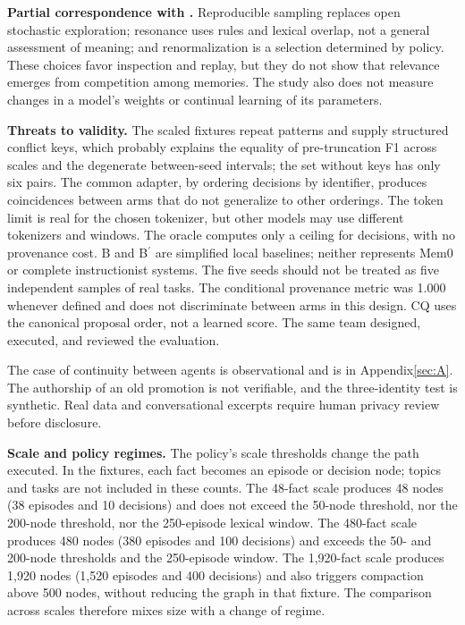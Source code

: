 \documentclass[11pt,a4paper]{article}
\begin{document}
\textbf{Partial correspondence with \cite{ref2}.} Reproducible sampling replaces open stochastic exploration; resonance uses rules and lexical overlap, not a general assessment of meaning; and renormalization is a selection determined by policy. These choices favor inspection and replay, but they do not show that relevance emerges from competition among memories. The study also does not measure changes in a model's weights or continual learning of its parameters.

\textbf{Threats to validity.} The scaled fixtures repeat patterns and supply structured conflict keys, which probably explains the equality of pre-truncation F1 across scales and the degenerate between-seed intervals; the set without keys has only six pairs. The common adapter, by ordering decisions by identifier, produces coincidences between arms that do not generalize to other orderings. The token limit is real for the chosen tokenizer, but other models may use different tokenizers and windows. The oracle computes only a ceiling for decisions, with no provenance cost. B and B\ensuremath{^{\prime}} are simplified local baselines; neither represents Mem0 or complete instructionist systems. The five seeds should not be treated as five independent samples of real tasks. The conditional provenance metric was 1.000 whenever defined and does not discriminate between arms in this design. CQ uses the canonical proposal order, not a learned score. The same team designed, executed, and reviewed the evaluation.

The case of continuity between agents is observational and is in Appendix\nobreakspace{}\ref{sec:A}. The authorship of an old promotion is not verifiable, and the three-identity test is synthetic. Real data and conversational excerpts require human privacy review before disclosure.

\textbf{Scale and policy regimes.} The policy's scale thresholds change the path executed. In the fixtures, each fact becomes an episode or decision node; topics and tasks are not included in these counts. The 48-fact scale produces 48 nodes (38 episodes and 10 decisions) and does not exceed the 50-node threshold, nor the 200-node threshold, nor the 250-episode lexical window. The 480-fact scale produces 480 nodes (380 episodes and 100 decisions) and exceeds the 50- and 200-node thresholds and the 250-episode window. The 1,920-fact scale produces 1,920 nodes (1,520 episodes and 400 decisions) and also triggers compaction above 500 nodes, without reducing the graph in that fixture. The comparison across scales therefore mixes size with a change of regime.
\end{document}
